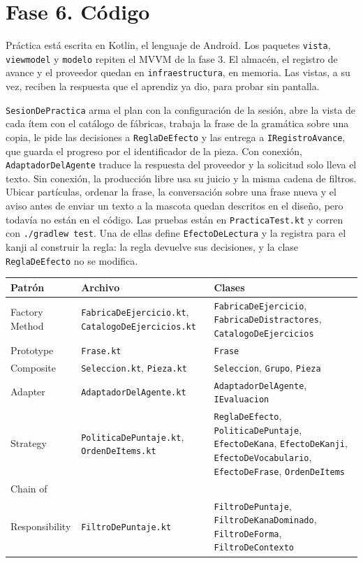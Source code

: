 \documentclass[11pt]{article}
\begin{document}
\section{Fase 6. Código}

Práctica está escrita en Kotlin, el lenguaje de Android. Los paquetes \texttt{vista}, \texttt{viewmodel} y \texttt{modelo} repiten el MVVM de la fase 3. El almacén, el registro de avance y el proveedor quedan en \texttt{infraestructura}, en memoria. Las vistas, a su vez, reciben la respuesta que el aprendiz ya dio, para probar sin pantalla.

\texttt{SesionDePractica} arma el plan con la configuración de la sesión, abre la vista de cada ítem con el catálogo de fábricas, trabaja la frase de la gramática sobre una copia, le pide las decisiones a \texttt{ReglaDeEfecto} y las entrega a \texttt{IRegistroAvance}, que guarda el progreso por el identificador de la pieza. Con conexión, \texttt{AdaptadorDelAgente} traduce la respuesta del proveedor y la solicitud solo lleva el texto. Sin conexión, la producción libre usa su juicio y la misma cadena de filtros. Ubicar partículas, ordenar la frase, la conversación sobre una frase nueva y el aviso antes de enviar un texto a la mascota quedan descritos en el diseño, pero todavía no están en el código. Las pruebas están en \texttt{PracticaTest.kt} y corren con \texttt{./gradlew test}. Una de ellas define \texttt{EfectoDeLectura} y la registra para el kanji al construir la regla: la regla devuelve sus decisiones, y la clase \texttt{ReglaDeEfecto} no se modifica.

\begin{center}
\small
\setlength{\tabcolsep}{3pt}
\renewcommand{\arraystretch}{1.15}
\begin{tabular}{@{}p{3.3cm}p{5.4cm}p{5.5cm}@{}}
\hline
Patrón & Archivo & Clases \\
\hline
Factory Method & \texttt{FabricaDeEjercicio.kt}, \texttt{CatalogoDeEjercicios.kt} & \texttt{FabricaDeEjercicio}, \texttt{FabricaDeDistractores}, \texttt{CatalogoDeEjercicios} \\
Prototype & \texttt{Frase.kt} & \texttt{Frase} \\
Composite & \texttt{Seleccion.kt}, \texttt{Pieza.kt} & \texttt{Seleccion}, \texttt{Grupo}, \texttt{Pieza} \\
Adapter & \texttt{AdaptadorDelAgente.kt} & \texttt{AdaptadorDelAgente}, \texttt{IEvaluacion} \\
Strategy & \texttt{PoliticaDePuntaje.kt}, \texttt{OrdenDeItems.kt} & \texttt{ReglaDeEfecto}, \texttt{PoliticaDePuntaje}, \texttt{EfectoDeKana}, \texttt{EfectoDeKanji}, \texttt{EfectoDeVocabulario}, \texttt{EfectoDeFrase}, \texttt{OrdenDeItems} \\
Chain of\\ Responsibility & \texttt{FiltroDePuntaje.kt} & \texttt{FiltroDePuntaje}, \texttt{FiltroDeKanaDominado}, \texttt{FiltroDeForma}, \texttt{FiltroDeContexto} \\
\hline
\end{tabular}
\end{center}
\end{document}
